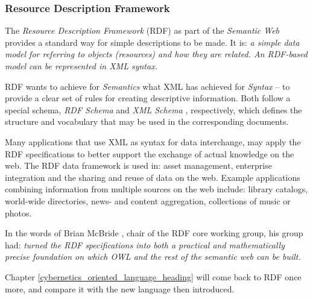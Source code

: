 %
%
%
%
%
%
%

\subsubsection{Resource Description Framework}
\label{resource_description_framework_heading}

The \emph{Resource Description Framework} (RDF) \cite{rdf} as part of the
\emph{Semantic Web} provides a standard way for simple descriptions to be made.
It is: \textit{a simple data model for referring to objects (resources) and how
they are related. An RDF-based model can be represented in XML syntax.}
\cite{wikipedia}

RDF wants to achieve for \emph{Semantics} what XML has achieved for
\emph{Syntax} -- to provide a clear set of rules for creating descriptive
information. Both follow a special schema, \emph{RDF Schema} \cite{rdf} and
\emph{XML Schema} \cite{xmlschema}, respectively, which defines the structure
and vocabulary that may be used in the corresponding documents.

Many applications that use XML as syntax for data interchange, may apply the
RDF specifications to better support the exchange of actual knowledge on the
web. The RDF data framework is used \cite{rdfowlrelease} in: asset management,
enterprise integration and the sharing and reuse of data on the web. Example
applications combining information from multiple sources on the web
\cite{rdfowlrelease} include: library catalogs, world-wide directories, news-
and content aggregation, collections of music or photos.

In the words of Brian McBride \cite{rdfowlrelease}, chair of the RDF core
working group, his group had: \textit{turned the RDF specifications into both a
practical and mathematically precise foundation on which OWL and the rest of
the semantic web can be built.}

Chapter \ref{cybernetics_oriented_language_heading} will come back to RDF once
more, and compare it with the new language then introduced.
